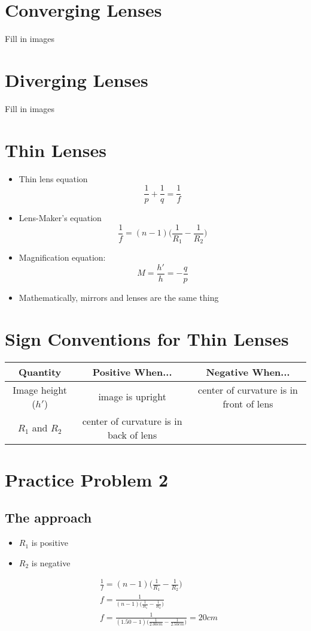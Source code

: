 \documentclass[12pt, letterpaper]{article}
\begin{document}
\section*{Converging Lenses}
Fill in images

\section*{Diverging Lenses}
Fill in images

\section*{Thin Lenses}

\begin{itemize}
    \item Thin lens equation \[\frac{1}{p} + \frac{1}{q} = \frac{1}{f}\]
    \item Lens-Maker's equation \[\frac{1}{f} = (n-1)\Big(\frac{1}{R_{1}}-\frac{1}{R_{2}}\Big)\]
    \item Magnification equation: \[M = \frac{h'}{h} = -\frac{q}{p}\]
    \item Mathematically, mirrors and lenses are the same thing
\end{itemize}

\section*{Sign Conventions for Thin Lenses}

\begin{tabular}{|c|c|c|}
    \hline
    Quantity & Positive When... & Negative When... \\
    \hline
    Image height ($h'$) & image is upright & center of curvature is in front of lens \\
    \hline
    $R_{1}$ and $R_{2}$ & center of curvature is in back of lens &  \\
    \hline
    
\end{tabular}

\section*{Practice Problem 2}
\subsection*{The approach}
\begin{itemize}
    \item $R_{1}$ is positive
    \item $R_{2}$ is negative
\end{itemize}
\begin{align*}
    & \frac{1}{f} = (n-1)\Big(\frac{1}{R_{1}}-\frac{1}{R_{2}}\Big) \\
    & f = \frac{1}{(n-1)\Big(\frac{1}{R_{1}}-\frac{1}{R_{2}}\Big)} \\
    & f = \frac{1}{(1.50-1)\Big(\frac{1}{2.00cm}-\frac{1}{2.50cm}\Big)} = 20cm
\end{align*}
\end{document}
